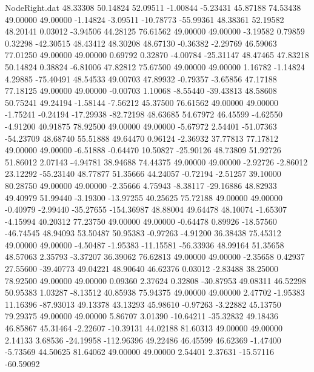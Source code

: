 \begin{filecontents}{NodeRight.dat}
  48.33308   50.14824   52.09511    -1.00844   -5.23431   45.87188   74.53438   49.00000   49.00000   -1.14824   -3.09511  -10.78773  -55.99361
  48.38361   52.19582   48.20141     0.03012   -3.94506   44.28125   76.61562   49.00000   49.00000   -3.19582    0.79859    0.32298  -42.30515
  48.43412   48.30208   48.67130    -0.36382   -2.29769   46.59063   77.01250   49.00000   49.00000    0.69792    0.32870   -4.00784  -25.31147
  48.47465   47.83218   50.14824     0.38824   -6.81006   47.82812   75.67500   49.00000   49.00000    1.16782   -1.14824    4.29885  -75.40491
  48.54533   49.00703   47.89932    -0.79357   -3.65856   47.17188   77.18125   49.00000   49.00000   -0.00703    1.10068   -8.55440  -39.43813
  48.58608   50.75241   49.24194    -1.58144   -7.56212   45.37500   76.61562   49.00000   49.00000   -1.75241   -0.24194  -17.29938  -82.72198
  48.63685   54.67972   46.45599    -4.62550   -4.91200   40.91875   78.92500   49.00000   49.00000   -5.67972    2.54401  -51.07363  -54.23709
  48.68740   55.51888   49.64470     0.96124   -2.36932   37.77813   77.17812   49.00000   49.00000   -6.51888   -0.64470   10.50827  -25.90126
  48.73809   51.92726   51.86012     2.07143   -4.94781   38.94688   74.44375   49.00000   49.00000   -2.92726   -2.86012   23.12292  -55.23140
  48.77877   51.35666   44.24057    -0.72194   -2.51257   39.10000   80.28750   49.00000   49.00000   -2.35666    4.75943   -8.38117  -29.16886
  48.82933   49.40979   51.99440    -3.19300  -13.97255   40.25625   75.72188   49.00000   49.00000   -0.40979   -2.99440  -35.27655 -154.36987
  48.88004   49.64478   48.10074    -1.65307   -4.15994   40.20312   77.23750   49.00000   49.00000   -0.64478    0.89926  -18.57560  -46.74545
  48.94093   53.50487   50.95383    -0.97263   -4.91200   36.38438   75.45312   49.00000   49.00000   -4.50487   -1.95383  -11.15581  -56.33936
  48.99164   51.35658   48.57063     2.35793   -3.37207   36.39062   76.62813   49.00000   49.00000   -2.35658    0.42937   27.55600  -39.40773
  49.04221   48.90640   46.62376     0.03012   -2.83488   38.25000   78.92500   49.00000   49.00000    0.09360    2.37624    0.32808  -30.87953
  49.08311   46.52298   50.95383     1.03287   -8.13512   40.85938   75.94375   49.00000   49.00000    2.47702   -1.95383   11.16396  -87.93013
  49.13378   43.13293   45.98610    -0.97263   -3.22882   45.13750   79.29375   49.00000   49.00000    5.86707    3.01390  -10.64211  -35.32832
  49.18436   46.85867   45.31464    -2.22607  -10.39131   44.02188   81.60313   49.00000   49.00000    2.14133    3.68536  -24.19958 -112.96396
  49.22486   46.45599   46.62369    -1.47400   -5.73569   44.50625   81.64062   49.00000   49.00000    2.54401    2.37631  -15.57116  -60.59092

\end{filecontents}
